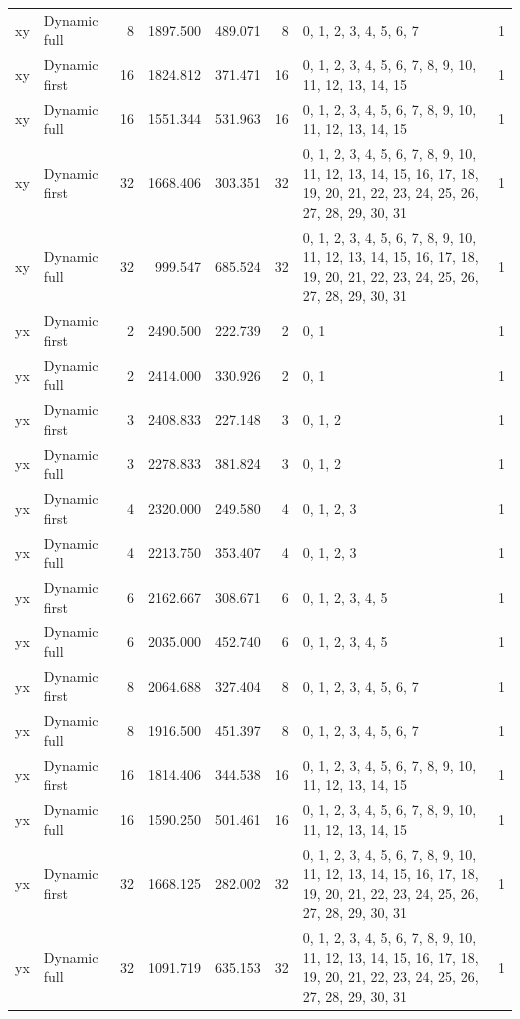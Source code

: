 \documentclass[10pt,a4paper]{article}
\begin{document}
\begin{longtable}{@{}p{23mm}p{29mm}rrrrp{36mm}r@{}}
xy & Dynamic full & 8 & 1897.500 & 489.071 & 8 & 0, 1, 2, 3, 4, 5, 6, 7 & 1 \\
xy & Dynamic first & 16 & 1824.812 & 371.471 & 16 & 0, 1, 2, 3, 4, 5, 6, 7, 8, 9, 10, 11, 12, 13, 14, 15 & 1 \\
xy & Dynamic full & 16 & 1551.344 & 531.963 & 16 & 0, 1, 2, 3, 4, 5, 6, 7, 8, 9, 10, 11, 12, 13, 14, 15 & 1 \\
xy & Dynamic first & 32 & 1668.406 & 303.351 & 32 & 0, 1, 2, 3, 4, 5, 6, 7, 8, 9, 10, 11, 12, 13, 14, 15, 16, 17, 18, 19, 20, 21, 22, 23, 24, 25, 26, 27, 28, 29, 30, 31 & 1 \\
xy & Dynamic full & 32 & 999.547 & 685.524 & 32 & 0, 1, 2, 3, 4, 5, 6, 7, 8, 9, 10, 11, 12, 13, 14, 15, 16, 17, 18, 19, 20, 21, 22, 23, 24, 25, 26, 27, 28, 29, 30, 31 & 1 \\
yx & Dynamic first & 2 & 2490.500 & 222.739 & 2 & 0, 1 & 1 \\
yx & Dynamic full & 2 & 2414.000 & 330.926 & 2 & 0, 1 & 1 \\
yx & Dynamic first & 3 & 2408.833 & 227.148 & 3 & 0, 1, 2 & 1 \\
yx & Dynamic full & 3 & 2278.833 & 381.824 & 3 & 0, 1, 2 & 1 \\
yx & Dynamic first & 4 & 2320.000 & 249.580 & 4 & 0, 1, 2, 3 & 1 \\
yx & Dynamic full & 4 & 2213.750 & 353.407 & 4 & 0, 1, 2, 3 & 1 \\
yx & Dynamic first & 6 & 2162.667 & 308.671 & 6 & 0, 1, 2, 3, 4, 5 & 1 \\
yx & Dynamic full & 6 & 2035.000 & 452.740 & 6 & 0, 1, 2, 3, 4, 5 & 1 \\
yx & Dynamic first & 8 & 2064.688 & 327.404 & 8 & 0, 1, 2, 3, 4, 5, 6, 7 & 1 \\
yx & Dynamic full & 8 & 1916.500 & 451.397 & 8 & 0, 1, 2, 3, 4, 5, 6, 7 & 1 \\
yx & Dynamic first & 16 & 1814.406 & 344.538 & 16 & 0, 1, 2, 3, 4, 5, 6, 7, 8, 9, 10, 11, 12, 13, 14, 15 & 1 \\
yx & Dynamic full & 16 & 1590.250 & 501.461 & 16 & 0, 1, 2, 3, 4, 5, 6, 7, 8, 9, 10, 11, 12, 13, 14, 15 & 1 \\
yx & Dynamic first & 32 & 1668.125 & 282.002 & 32 & 0, 1, 2, 3, 4, 5, 6, 7, 8, 9, 10, 11, 12, 13, 14, 15, 16, 17, 18, 19, 20, 21, 22, 23, 24, 25, 26, 27, 28, 29, 30, 31 & 1 \\
yx & Dynamic full & 32 & 1091.719 & 635.153 & 32 & 0, 1, 2, 3, 4, 5, 6, 7, 8, 9, 10, 11, 12, 13, 14, 15, 16, 17, 18, 19, 20, 21, 22, 23, 24, 25, 26, 27, 28, 29, 30, 31 & 1 \\
\end{longtable}\normalsize\setlength{\tabcolsep}{6pt}
\clearpage
\end{document}
